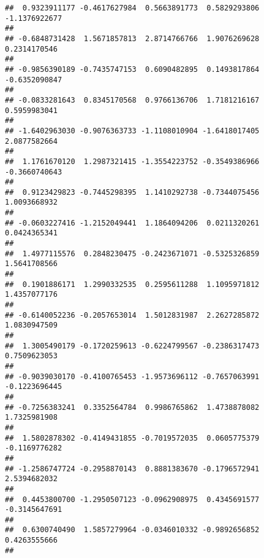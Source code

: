 \documentclass[]{article}
\begin{document}
\begin{verbatim}
##  0.9323911177 -0.4617627984  0.5663891773  0.5829293806 -1.1376922677 
##                                                                       
## -0.6848731428  1.5671857813  2.8714766766  1.9076269628  0.2314170546 
##                                                                       
## -0.9856390189 -0.7435747153  0.6090482895  0.1493817864 -0.6352090847 
##                                                                       
## -0.0833281643  0.8345170568  0.9766136706  1.7181216167  0.5959983041 
##                                                                       
## -1.6402963030 -0.9076363733 -1.1108010904 -1.6418017405  2.0877582664 
##                                                                       
##  1.1761670120  1.2987321415 -1.3554223752 -0.3549386966 -0.3660740643 
##                                                                       
##  0.9123429823 -0.7445298395  1.1410292738 -0.7344075456  1.0093668932 
##                                                                       
## -0.0603227416 -1.2152049441  1.1864094206  0.0211320261  0.0424365341 
##                                                                       
##  1.4977115576  0.2848230475 -0.2423671071 -0.5325326859  1.5641708566 
##                                                                       
##  0.1901886171  1.2990332535  0.2595611288  1.1095971812  1.4357077176 
##                                                                       
## -0.6140052236 -0.2057653014  1.5012831987  2.2627285872  1.0830947509 
##                                                                       
##  1.3005490179 -0.1720259613 -0.6224799567 -0.2386317473  0.7509623053 
##                                                                       
## -0.9039030170 -0.4100765453 -1.9573696112 -0.7657063991 -0.1223696445 
##                                                                       
## -0.7256383241  0.3352564784  0.9986765862  1.4738878082  1.7325981908 
##                                                                       
##  1.5802878302 -0.4149431855 -0.7019572035  0.0605775379 -0.1169776282 
##                                                                       
## -1.2586747724 -0.2958870143  0.8881383670 -0.1796572941  2.5394682032 
##                                                                       
##  0.4453800700 -1.2950507123 -0.0962908975  0.4345691577 -0.3145647691 
##                                                                       
##  0.6300740490  1.5857279964 -0.0346010332 -0.9892656852  0.4263555666 
##                                                                       

\end{verbatim}
\end{document}
